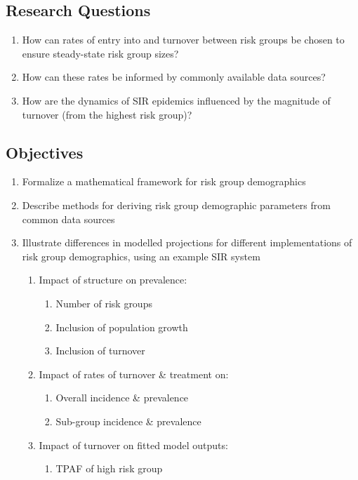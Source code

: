 \documentclass{article}
\title{}
\date{2019 April 05}
\begin{document}
  \maketitle
  \subsection*{Research Questions}
  \begin{enumerate}
    \item How can rates of entry into and turnover between risk groups
    be chosen to ensure steady-state risk group sizes?
    \item How can these rates be informed by commonly available data sources?
    \item How are the dynamics of SIR epidemics influenced by the magnitude of turnover
    (from the highest risk group)?
  \end{enumerate}
  \subsection*{Objectives}
  \begin{enumerate}
    \item Formalize a mathematical framework for risk group demographics
    \item Describe methods for deriving risk group demographic parameters from common data sources
    \item Illustrate differences in modelled projections
    for different implementations of risk group demographics,
    using an example SIR system
    \begin{enumerate}
      \item Impact of structure on prevalence:
      \begin{enumerate}
        \item Number of risk groups
        \item Inclusion of population growth
        \item Inclusion of turnover
      \end{enumerate}
      \item Impact of rates of turnover \& treatment on:
      \begin{enumerate}
        \item Overall incidence \& prevalence
        \item Sub-group incidence \& prevalence
      \end{enumerate}
      \item Impact of turnover on fitted model outputs:
      \begin{enumerate}
        \item TPAF of high risk group
      \end{enumerate}
    \end{enumerate}
  \end{enumerate}
\end{document}
